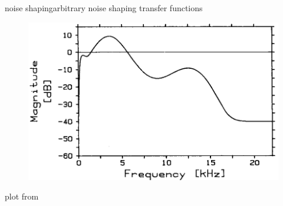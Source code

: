 	\begin{frame}{noise shaping}{arbitrary noise shaping transfer functions}
		\begin{figure}
			\centering
				\includegraphics[scale=0.3]{Graph/NoiseShapingATH}
		\end{figure}
        plot from 
	\end{frame}
	
